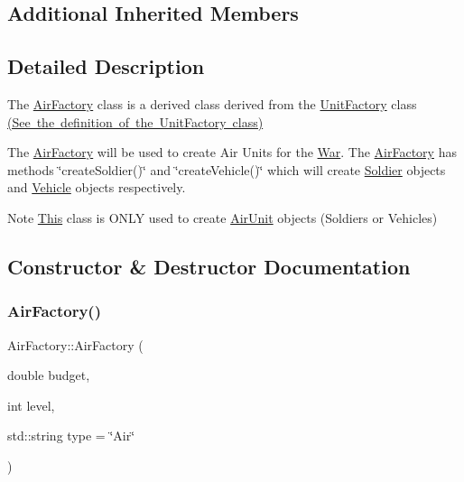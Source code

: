 \subsection*{Additional Inherited Members}


\subsection{Detailed Description}
The \mbox{\hyperlink{class_air_factory}{Air\+Factory}} class is a derived class derived from the \mbox{\hyperlink{class_unit_factory}{Unit\+Factory}} class \mbox{\hyperlink{_unit_factory_8h_source}{(See the definition of the Unit\+Factory class)}}

The \mbox{\hyperlink{class_air_factory}{Air\+Factory}} will be used to create Air Units for the \mbox{\hyperlink{class_war}{War}}. The \mbox{\hyperlink{class_air_factory}{Air\+Factory}} has methods \char`\"{}create\+Soldier()\char`\"{} and \char`\"{}create\+Vehicle()\char`\"{} which will create \mbox{\hyperlink{class_soldier}{Soldier}} objects and \mbox{\hyperlink{class_vehicle}{Vehicle}} objects respectively. \begin{DoxyNote}{Note}
\mbox{\hyperlink{class_this}{This}} class is O\+N\+LY used to create \mbox{\hyperlink{class_air_unit}{Air\+Unit}} objects (Soldiers or Vehicles) 
\end{DoxyNote}


\subsection{Constructor \& Destructor Documentation}
\mbox{\label{class_air_factory_a732ac84bdb7a41c7118ac5e55a737165}} 
\subsubsection{\texorpdfstring{AirFactory()}{AirFactory()}}
{\footnotesize\ttfamily Air\+Factory\+::\+Air\+Factory (\begin{DoxyParamCaption}\item[{double}]{budget,  }\item[{int}]{level,  }\item[{std\+::string}]{type = {\ttfamily \char`\"{}Air\char`\"{}} }\end{DoxyParamCaption})}



